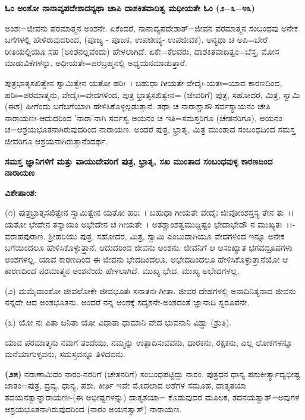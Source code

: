 \begin{center}
\textbf{ಓಂ ಅಂಶೋ ನಾನಾವ್ಯಪದೇಶಾದನ್ಯಥಾ ಚಾಪಿ ದಾಶಕಿತವಾದಿತ್ವ ಮಧೀಯತೇ ಓಂ (೨$-$೩$-$೪೩)}
\end{center}

ಅಂಶಃ=ಜೀವನು ಪರಮಾತ್ಮನ ಅಂಶನೇ. ಏಕೆಂದರೆ, ನಾನಾವ್ಯಪದೇಶಾತ್=ಜೀವನ ಪರಮಾತ್ಮನ ಸಂಬಂಧವು ಅನೇಕ ಬಗೆಗಳಲ್ಲಿ ಹೇಳಿರುವುದರಿಂದ, (ಪೂಜ್ಯ - ಪೂಜಕ, ಉಪಜೀವ್ಯ- ಉಪಜೀವಕ), ಅನ್ಯಥಾ ಚ ಅಪಿ=ಬೇರೆ ರೀತಿಯಲ್ಲಿಯೂ ಸಹ (ಅಂಶನಲ್ಲವೆಂದು) ಹೇಳಲಾಗಿದೆ. ಏಕೇ=ಕೆಲವರು, ದಾಶಕಿತವಾದಿತ್ವಂ=ಬೆಸ್ತ, ಮೋಸ ಮಾಡುವಿಕೆಗಳನ್ನು, ಅಧೀಯತೇ=ಪರಬ್ರಹ್ಮನಲ್ಲಿ ಅಧ್ಯಯನಮಾಡುತ್ತಾರೆ.

ಪುತ್ರಭಾತೃಸಖಿತ್ವೇನ ಸ್ವಾಮಿತ್ವೇನ ಯತೋ ಹರಿಃ~। ಬಹುಧಾ ಗೀಯತೇ ವೇದೈಃ-ಯತಃ=ಯಾವ ಕಾರಣದಿಂದ, ಹರಿಃ=ಪರಮಾತ್ಮನು, ವೇದೈಃ=ವೇದಗಳಿಂದ, ಪುತ್ರ ಭ್ರಾತೃಸಖಿತ್ವೇನ= (ಜೀವರಿಗೆ) ಪುತ್ರ, ಸಹೋದರ, ಮಿತ್ರ, ಸ್ವಾಮಿ (ಈಶ) ಹೀಗೆಂದು ಬಗೆಬಗೆಯಾಗಿ ಹೇಳಿಸಿಕೊಳ್ಳಲ್ಪಡುತ್ತಾನೆ. ತಥಾ ಚ ನಾರಾಶ್ಚಾಸೌ ಸರ್ವಸ್ಯಾಯನಂ ಚೇತಿ ನಾರಾ\-ಯಣಃ-ಆದುದರಿಂದ 'ನಾರಾ'ನಾಗಿ ಸರ್ವಸ್ವ ಅಯನಂ ಚ ಇತಿ=ಸಮಸ್ತರಿಗೂ (ಚೇತನರಿಗೂ), ಅಯನಂ ಚ=ಆಶ್ರಯಭೂತನಾಗಿರುವುದರಿಂದ ನಾರಾಯಣ. ಅಂದರೆ ಪುತ್ರ, ಭ್ರಾತೃ, ಮಿತ್ರ ಮುಂತಾದ ಸಂಬಂಧದಿಂದ ಸಮಸ್ತ ಜೀವರಿಗೂ ಆಶ್ರಯನಾಗಿರುತ್ತಾನೆಂದರ್ಥ.

\begin{center}
\textbf{ಸಮಸ್ತ ಜ್ಞಾನಿಗಳಿಗೆ ಮತ್ತು ವಾಯುದೇವರಿಗೆ ಪುತ್ರ, ಭ್ರಾತೃ, ಸಖ ಮುಂತಾದ ಸಂಬಂಧವುಳ್ಳ ಕಾರಣದಿಂದ ನಾರಾಯಣ}
\end{center}

\noindent
\textbf{ವಿಶೇಷಾಂಶ:\enginline{-}}

(೧) ಪುತ್ರಭ್ರಾತೃಸಖಿತ್ವೇನ ಸ್ವಾಮಿತ್ವೇನ ಯತೋ ಹರಿಃ~। ಬಹುಧಾ ಗೀಯತೇ ವೇದೈಃ ಜೀವೋಂಶಸ್ತಸ್ಯ ತೇನ ತು~।। ಯತೋ ಭೇದೇನ ತಸ್ಯಾಯಂ ಅಭೇದೇನ ಚ ಗೀಯತೇ~। ಅತಶ್ಚಾಂಶತ್ವಮುದ್ದಿಷ್ಟಂ ಭೇದಾಭೇದೌ ನ ಮುಖ್ಯತಃ~।।-ವರಾಹಪುರಾಣ. ಶ‍್ರೀಹರಿಯು ಪುತ್ರ, ಸಹೋದರ, ಮಿತ್ರ, ಸ್ವಾಮಿ ಎಂಬುದಾಗಿಯೂ ವೇದಗಳಿಂದ ಇನ್ನೂ ಅನೇಕ ಬಗೆಯಿಂದಲೂ ಹೇಳಿಸಿಕೊಳ್ಳುತ್ತಾನೆ. ಆದುದರಿಂದ ಜೀವನು ಅಂಶನು. ಜೀವನಿಗೆ ಆ ಅಸಂಖ್ಯಾತ ಭಗವದ್ರೂಪಗಳು ಅಂಶಗಳಲ್ಲ. ಯಾವ ಕಾರಣದಿಂದ ಈ ಜೀವನು ಭೇದದಿಂದಲೂ, ಅಭೇದದಿಂದಲೂ ಹೇಳಿಸಿಕೊಳ್ಳುತ್ತಾನೆಯೋ ಆ ಕಾರಣದಿಂದ ಪರಮಾತ್ಮನ ಅಂಶನೆಂದು ಹೇಳಲಾಗಿದೆ. ಮುಖ್ಯ ಭೇದ, ಮುಖ್ಯ ಅಭೇದಗಳಲ್ಲ,

(೨) ಮಮೈವಾಂಶೋ ಜೀವಲೋಕೇ ಜೀವಭೂತಃ ಸನಾತನಃ-ಗೀತಾ. ಜೀವರ ದೇಹಗಳಲ್ಲಿ ಅನಾದಿನಿತ್ಯನಾದ ಜೀವನು ನನ್ನದೇ ಆದ ಅಂಶಭೂತನು. ಅಂದರೆ ನನ್ನ ಅಂಶಕ್ಕೆ ಸದೃಶನೇ-ಅಂಶದಂತೆ ಜ್ಞಾನಾದಿ ಸ್ವರೂಪನೇ.

(೩) ಯೋ ನಃ ಪಿತಾ ಜನಿತಾ ಯೋ ವಿಧಾತಾ ಧಾಮಾನಿ ವೇದ ಭುವನಾನಿ ವಿಶ್ವಾ (ಶ್ರುತಿ).

ಯಾವ ಪರಮಾತ್ಮನು ನಮಗೆ ತಂದೆಯು, ನಮ್ಮನ್ನು ಉತ್ಪಾದಿಸುವವನು, ಧಾರಕನು, ರಕ್ಷಕನು, ಎಲ್ಲ ಲೋಕಗಳನ್ನೂ ಮನೆಯಾಗುಳ್ಳವನು, ಸಮಸ್ತವನ್ನೂ ತಿಳಿದವನು.

\textbf{(೨೫)} ನರಾಣಾಮಿದಂ ನಾರಂ-ನರರಿಗೆ (ಚೇತನರಿಗೆ) ಸಂಬಂಧಪಟ್ಟಿದ್ದು ನಾರಂ. ಪುತ್ರಧನ ಧಾನ್ಯ ಪಶುಕೀರ್ತ್ಯಾದ್ಯಭೀಷ್ಟ ಜಾತಂ=ಪುತ್ರ, ದ್ರವ್ಯ, ಧಾನ್ಯ, ಪಶು, ಕೀರ್ತಿ ಇವೇ ಮೊದಲಾದ ಅಶೆಗಳ ಸಮೂಹ, ದಾತೃತಯಾ ತದಯನತ್ವಾನ್ನಾರಾಯಣಃ-(ಈ ಅಭೀಷ್ಟಗಳನ್ನು) ದಾತೃತಯಾ= ಕೊಡುವುದರ ಮೂಲಕ, ತದನಯತ್ವಾತ್=ಅವುಗಳ ಆಶ್ರಯಭೂತನಾಗಿರುವುದರಿಂದ (ನಾರಂ ಅಯನತ್ವಾತ್) ನಾರಾಯಣ.


